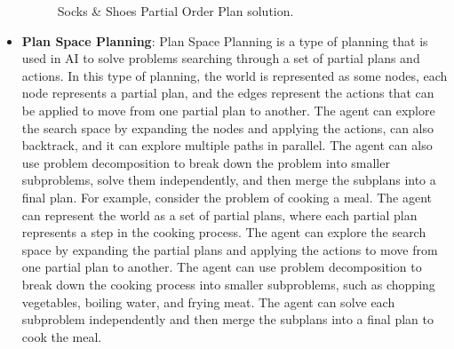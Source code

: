 \begin{itemize}
            \begin{figure}[ht]
                  \centering
                  \caption{Socks \& Shoes Partial Order Plan solution.}
                  \label{fig:socks_shoes_partial_order_plan}
            \end{figure}
      \item \label{def:plan_space_planning}
            \textbf{Plan Space Planning}: Plan Space Planning is a type of planning that is used in \ac{AI} to solve problems searching through a set of partial plans and actions. In this type of planning, the world is represented as some nodes, each node represents a partial plan, and the edges represent the actions that can be applied to move from one partial plan to another. The agent can explore the search space by expanding the nodes and applying the actions, can also backtrack, and it can explore multiple paths in parallel. The agent can also use problem decomposition to break down the problem into smaller subproblems, solve them independently, and then merge the subplans into a final plan. For example, consider the problem of cooking a meal. The agent can represent the world as a set of partial plans, where each partial plan represents a step in the cooking process. The agent can explore the search space by expanding the partial plans and applying the actions to move from one partial plan to another. The agent can use problem decomposition to break down the cooking process into smaller subproblems, such as chopping vegetables, boiling water, and frying meat. The agent can solve each subproblem independently and then merge the subplans into a final plan to cook the meal.


\end{itemize}
